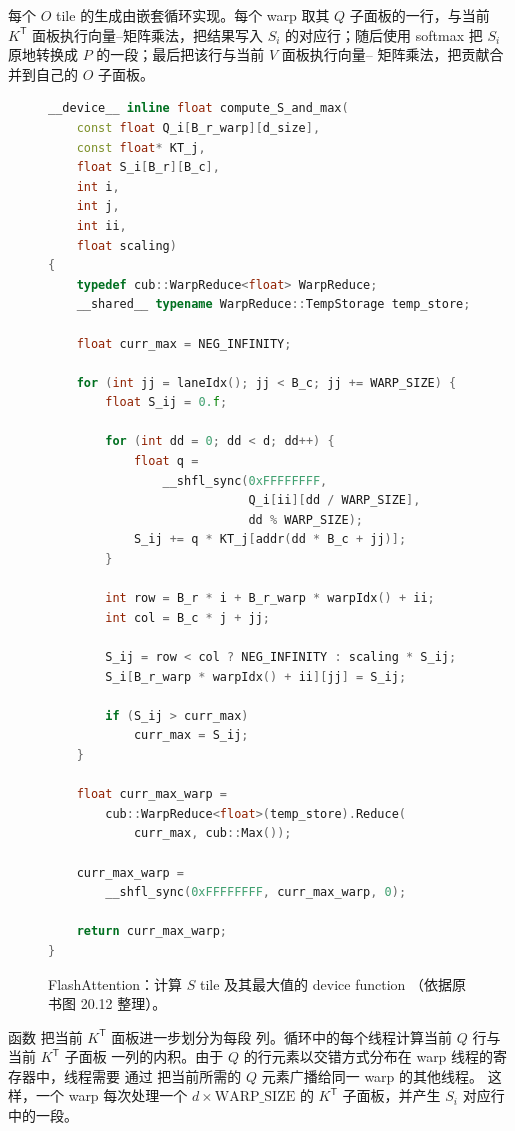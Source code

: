 每个 $O$ tile 的生成由嵌套循环实现。每个 warp 取其 $Q$ 子面板的一行，与当前
$K^{\mathsf T}$ 面板执行向量--矩阵乘法，把结果写入 $S_i$ 的对应行；随后使用
softmax 把 $S_i$ 原地转换成 $P$ 的一段；最后把该行与当前 $V$ 面板执行向量--
矩阵乘法，把贡献合并到自己的 $O$ 子面板。

\begin{figure}[htbp]
  \centering
  \begin{lstlisting}[language=C++,basicstyle=\ttfamily\tiny]
__device__ inline float compute_S_and_max(
    const float Q_i[B_r_warp][d_size],
    const float* KT_j,
    float S_i[B_r][B_c],
    int i,
    int j,
    int ii,
    float scaling)
{
    typedef cub::WarpReduce<float> WarpReduce;
    __shared__ typename WarpReduce::TempStorage temp_store;

    float curr_max = NEG_INFINITY;

    for (int jj = laneIdx(); jj < B_c; jj += WARP_SIZE) {
        float S_ij = 0.f;

        for (int dd = 0; dd < d; dd++) {
            float q =
                __shfl_sync(0xFFFFFFFF,
                            Q_i[ii][dd / WARP_SIZE],
                            dd % WARP_SIZE);
            S_ij += q * KT_j[addr(dd * B_c + jj)];
        }

        int row = B_r * i + B_r_warp * warpIdx() + ii;
        int col = B_c * j + jj;

        S_ij = row < col ? NEG_INFINITY : scaling * S_ij;
        S_i[B_r_warp * warpIdx() + ii][jj] = S_ij;

        if (S_ij > curr_max)
            curr_max = S_ij;
    }

    float curr_max_warp =
        cub::WarpReduce<float>(temp_store).Reduce(
            curr_max, cub::Max());

    curr_max_warp =
        __shfl_sync(0xFFFFFFFF, curr_max_warp, 0);

    return curr_max_warp;
}
  \end{lstlisting}
  \caption{FlashAttention：计算 $S$ tile 及其最大值的 device function
  （依据原书图 20.12 整理）。}
  \label{fig:20-12}
\end{figure}

函数  把当前 $K^{\mathsf T}$ 面板进一步划分为每段
 列。循环中的每个线程计算当前 $Q$ 行与当前 $K^{\mathsf T}$ 子面板
一列的内积。由于 $Q$ 的行元素以交错方式分布在 warp 线程的寄存器中，线程需要
通过  把当前所需的 $Q$ 元素广播给同一 warp 的其他线程。
这样，一个 warp 每次处理一个 $d\times\mathrm{WARP\_SIZE}$ 的 $K^{\mathsf T}$
子面板，并产生 $S_i$ 对应行中的一段。

